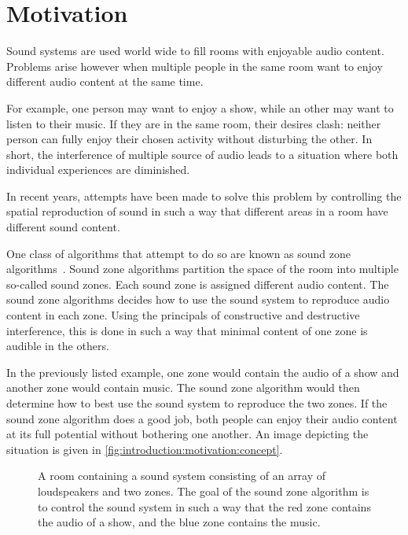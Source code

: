 \section{Motivation}
\label{ch:introduction:motivation}
Sound systems are used world wide to fill rooms with enjoyable audio content. 
Problems arise however when multiple people in the same room want to enjoy different audio content at the same time.

For example, one person may want to enjoy a show, while an other may want to listen to their music.
If they are in the same room, their desires clash: neither person can fully enjoy their chosen activity without disturbing
the other.
In short, the interference of multiple source of audio leads to a situation where both individual experiences are diminished.

In recent years, attempts have been made to solve this problem by controlling the spatial reproduction of sound in such
a way that different areas in a room have different sound content.

One class of algorithms that attempt to do so are known as sound zone algorithms~\cite{betlehem2015personal}.
Sound zone algorithms partition the space of the room into multiple so-called sound zones.
Each sound zone is assigned different audio content.
The sound zone algorithms decides how to use the sound system to reproduce audio content in each zone.
Using the principals of constructive and destructive interference, this is done in such a way that minimal 
content of one zone is audible in the others.

In the previously listed example, one zone would contain the audio of a show and another zone would contain music.
The sound zone algorithm would then determine how to best use the sound system to reproduce the two zones.
If the sound zone algorithm does a good job, both people can enjoy their audio content at its full potential 
without bothering one another.
An image depicting the situation is given in \autoref{fig:introduction:motivation:concept}.

\begin{figure}[t]
    \centering
    \scalebox{1.0}{}
    \caption{A room containing a sound system consisting of an array of loudspeakers and two zones.
                The goal of the sound zone algorithm is to control the sound system in such a way that the red zone
                contains the audio of a show, and the blue zone contains the music.}
    \label{fig:introduction:motivation:concept}
\end{figure}

